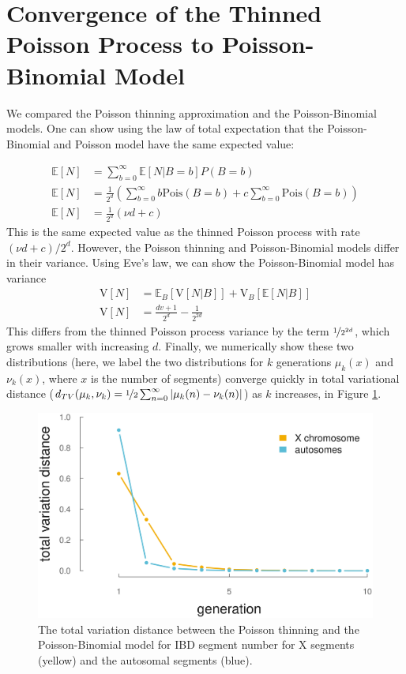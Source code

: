 \documentclass[9pt,twocolumn,twoside]{gsajnl}
\newcommand{\E}{\mathbb{E}}
\newcommand{\V}{\text{V}}
\begin{document}
\newpage
\appendix

\section*{Convergence of the Thinned Poisson Process to Poisson-Binomial Model}
\label{ap:pois-thin}

We compared the Poisson thinning approximation and the Poisson-Binomial models.
One can show using the law of total expectation that the Poisson-Binomial and
Poisson model have the same expected value:

\begin{align*}
  \E[N] &= \sum_{b=0}^\infty \E[N | B = b]P(B = b) \nonumber\\
  \E[N] &= \frac{1}{2^d} \left( \sum_{b=0}^\infty b \text{Pois}(B = b) + c \sum_{b=0}^\infty \text{Pois}(B = b) \right)  \nonumber\\
  \E[N] &= \frac{1}{2^d} (\nu d + c) 
\end{align*}
%
This is the same expected value as the thinned Poisson process with rate $(\nu
d + c)/2^d$. However, the Poisson thinning and Poisson-Binomial models differ
in their variance. Using Eve's law, we can show the Poisson-Binomial model has
variance
%
\begin{align*}
  \V[N] &= \E_B[\V[N | B]] + \V_B[\E[N|B]]  \nonumber\\
  \V[N] &= \frac{dv + 1}{2^d} - \frac{1}{2^{2d}}
\end{align*}
%
This differs from the thinned Poisson process variance by the term
$\nicefrac{1}{2^{2d}}$, which grows smaller with increasing $d$. Finally, we
numerically show these two distributions (here, we label the two distributions
for $k$ generations $\mu_k(x)$ and $\nu_k(x)$, where $x$ is the number of
segments) converge quickly in total variational distance ($d_{TV}(\mu_k, \nu_k) =
\nicefrac{1}{2}\sum_{n = 0}^\infty | \mu_k(n) - \nu_k(n) |$) as $k$ increases,
in Figure \ref{fig:total-var-dist}.

\begin{figure}[!ht]
  \centering
  \includegraphics[width=\linewidth]{images/total-var-dist}

  \caption{The total variation distance between the Poisson thinning and the Poisson-Binomial model for IBD segment number for X segments (yellow) and the autosomal segments (blue).}

\label{fig:total-var-dist}
\end{figure}
\end{document}
